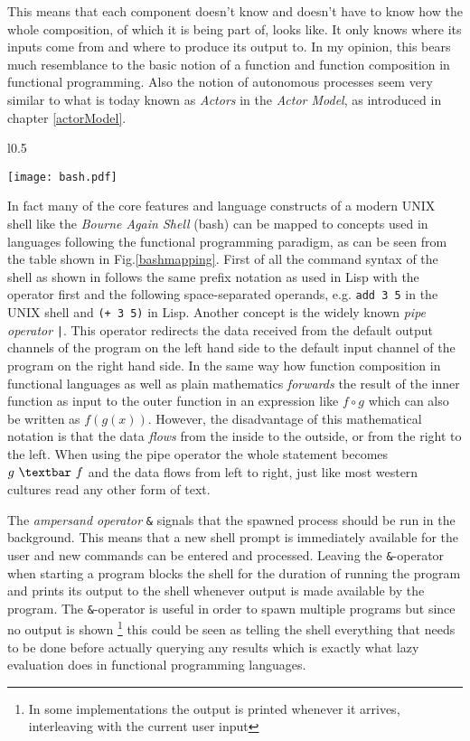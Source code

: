 This means that each component doesn't know and doesn't have to know
how the whole composition, of which it is being part of, looks like.
It only knows where its inputs come from and where to produce its
output to. In my opinion, this bears much resemblance to the basic
notion of a function and function composition in functional programming.
Also the notion of autonomous processes seem very similar to what
is today known as \textit{Actors} in the \textit{Actor Model},
as introduced in chapter \ref{actorModel}.

\begin{wrapfigure}{l}{0.5\textwidth}

  \texttt{[image: bash.pdf]}
  \caption{Mapping of concepts from the original UNIX shell to
          functional programming concepts.}
  \label{bashmapping}
  \vspace{-100pt}

\end{wrapfigure}

In fact many of the core features and language constructs of a modern
UNIX shell like the \textit{Bourne Again Shell} (bash) \cite{bash}
can be mapped to concepts used in languages following the
functional programming paradigm, as can be seen from the table
shown in Fig.\ref{bashmapping}. First of all the command syntax of the
shell as shown in \cite{unix78} follows the same prefix notation
as used in Lisp \cite{lisp86} with the operator first and the following
space-separated operands, e.g. \texttt{add 3 5} in the UNIX
shell and \texttt{(+ 3 5)} in Lisp.
Another concept is the widely known \textit{pipe operator} \texttt{|}.
This operator redirects the data received from the default output
channels of the program on the left hand side to the default input
channel of the program on the right hand side. In the same way how
function composition in functional languages as well as plain mathematics
\textit{forwards} the result of the inner function as input to the outer
function in an expression like $f \circ g$ which can also be written as
$f(g(x))$. However, the disadvantage of this mathematical notation
is that the data \textit{flows} from the inside to the outside, or
from the right to the left. When using the pipe operator the whole
statement becomes $g\ \textbar \ f$ and the data flows from left to right,
just like most western cultures read any other form of text.

The \textit{ampersand operator} \texttt{\&} signals that the spawned process
should be run in the background. This means that a new shell
prompt is immediately available for the user and new commands can be
entered and processed. Leaving the \texttt{\&}-operator when starting a program
blocks the shell for the duration of running the program and prints its
output to the shell whenever output is made available by the program.
The \texttt{\&}-operator is useful in order to spawn multiple programs but
since no output is shown \footnote{In some implementations the output
is printed whenever it arrives, interleaving with the current user
input} this could be seen as telling the shell
everything that needs to be done before actually querying any results
which is exactly what lazy evaluation does in functional programming
languages.

